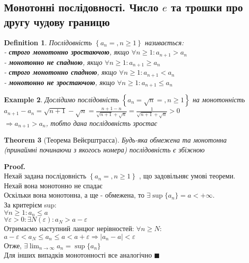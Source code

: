 \documentclass[a4paper, 14pt]{extarticle}
\def\huge{\displaystyle}
\newcommand{\sequence}[2][{}]{%
\ifthenelse{\equal{#1}{}}{$\{{#2}, n \geq 1 \}$}
{$\huge \left\{ {#2} = {#1}, n \geq 1 \right\}$}%
}
\theoremstyle{theoremdd}
\newtheorem{theorem}{Theorem}[subsection]
\theoremstyle{theoremdd}
\newtheorem{definition}[theorem]{Definition}
\theoremstyle{theoremdd}
\theoremstyle{theoremdd}
\newtheorem{example}[theorem]{Example}
\theoremstyle{theoremdd}
\theoremstyle{theoremdd}
\theoremstyle{theoremdd}
\theoremstyle{theoremdd}
\newenvironment{pf}{\vspace*{-3mm} \textbf{Proof. \\}}{$\blacksquare$}
\begin{document}
	\subsection{Монотонні послідовності. Число $e$ та трошки про другу чудову границю}
	\begin{definition}
	Послідовність \sequence{a_n} називається:\\
	- \textbf{строго монотонно зростаючою}, якщо $\forall n \geq 1: a_{n+1} > a_n$\\
	- \textbf{монотонно не спадною}, якщо $\forall n \geq 1: a_{n+1} \geq a_n$\\
	- \textbf{строго монотонно спадною}, якщо $\forall n \geq 1: a_{n+1} < a_n$\\
	- \textbf{монотонно не зростаючою}, якщо $\forall n \geq 1: a_{n+1} \leq a_n$
	\end{definition}
	
	\begin{example}
	Дослідимо послідовність \sequence{a_n = \sqrt{n}} на монотонність\\
	$\displaystyle a_{n+1} - a_n = \sqrt{n+1} - \sqrt{n} = \frac{n+1-n}{\sqrt{n+1} + \sqrt{n}} = \frac{1}{\sqrt{n+1} + \sqrt{n}} > 0$\\
	$\Rightarrow a_{n+1}>a_n$, тобто дана послідовність зростає
	\end{example}
	
	\begin{theorem}[Теорема Вейєрштрасса]
	Будь-яка обмежена та монотонна (принаймні починаючи з якогось номера) послідовність є збіжною
	\end{theorem}
	\begin{pf}
	Нехай задана послідовність \sequence{a_n}, що задовільняє умові теореми. Нехай вона монотонно не спадає\\
	Оскільки вона монотонна, а ще - обмежена, то $\exists \sup\{a_n\} = a < +\infty$.\\
	За критерієм sup: \\
	$\forall n \geq 1: a_n \leq a$\\
	$\forall \varepsilon > 0: \exists N(\varepsilon): a_{N} > a - \varepsilon$\\
	Отримаємо наступний ланцюг нерівностей: $\forall n \geq N:$\\
	$a-\varepsilon < a_N \leq a_n \leq a < a + \varepsilon \Rightarrow |a_n-a|<\varepsilon$\\
	Отже, $\displaystyle \exists \lim_{n \to \infty} a_n = \sup\{a_n\}$\\
	Для інших випадків монотонності все аналогічно
	\end{pf}
	
\end{document}

